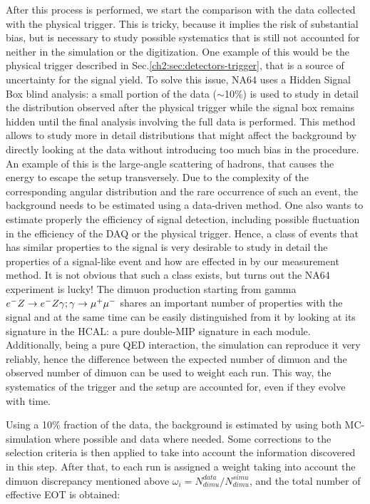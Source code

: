 After this process is performed, we start the comparison with the data collected with the physical trigger. This is tricky, because it implies the risk of substantial bias, but is necessary to study possible systematics that is still not accounted for neither in the simulation or the digitization. One example of this would be the physical trigger described in Sec.\ref{ch2:sec:detectors-trigger}, that is a source of uncertainty for the signal yield. To solve this issue, NA64 uses a Hidden Signal Box blind analysis\cite{blind-analysis}: a small portion of the data ($\sim$10\%) is used to study in detail the distribution observed after the physical trigger while the signal box remains hidden until the final analysis involving the full data is performed. This method allows to study more in detail distributions that might affect the background by directly looking at the data without introducing too much bias in the procedure. An example of this is the large-angle scattering of hadrons, that causes the energy to escape the setup transversely. Due to the complexity of the corresponding angular distribution and the rare occurrence of such an event, the background needs to be estimated using a data-driven method. One also wants to estimate properly the efficiency of signal detection, including possible fluctuation in the efficiency of the DAQ or the physical trigger. Hence, a class of events that has similar properties to the signal is very desirable to study in detail the properties of a signal-like event and how are effected in by our measurement method. It is not obvious that such a class exists, but turns out the NA64 experiment is lucky! The dimuon production starting from gamma $e^- Z \to e^- Z \gamma; \gamma \to \mu^+ \mu^-$ shares an important number of properties with the signal and at the same time can be easily distinguished from it by looking at its signature in the HCAL: a pure double-MIP signature in each module. Additionally, being a pure QED interaction, the simulation can reproduce it very reliably, hence the difference between the expected number of dimuon and the observed number of dimuon can be used to weight each run. This way, the systematics of the trigger and the setup are accounted for, even if they evolve with time.

Using a 10\% fraction of the data, the background is estimated by using both MC-simulation where possible and data where needed. Some corrections to the selection criteria is then applied to take into account the information discovered in this step. After that, to each run is assigned a weight taking into account the dimuon discrepancy mentioned above $\omega_i = N^{data}_{dimu}/N^{simu}_{dimu}$, and the total number of effective EOT is obtained:

